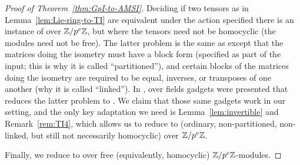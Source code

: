 \begin{proof}[Proof of Theorem~\ref{thm:GpI-to-AMSI}]
Deciding if two tensors as in Lemma~\ref{lem:Lie-ring-to-TI} are equivalent under the action specified there is an instance of  over $\mathbb{Z}/p^e \mathbb{Z}$, but where the tensors need not be homocyclic (the modules need not be free). The latter problem is the same as  except that the matrices doing the isometry must have a block form (specified as part of the input; this is why it is called ``partitioned''), and certain blocks of the matrices doing the isometry are required to be equal, inverses, or transposes of one another (why it is called ``linked''). In \cite{TI4}, over fields gadgets were presented that reduces the latter problem to . We claim that those same gadgets work in our setting, and the only key adaptation we need is Lemma~\ref{lem:invertible} and Remark~\ref{rem:TI4}, which allows us to reduce to (ordinary, non-partitioned, non-linked, but still not necessarily homocyclic)   over $\mathbb{Z}/p^e \mathbb{Z}$. 

Finally, we reduce to  over free (equivalently, homocyclic) $\mathbb{Z}/p^e \mathbb{Z}$-modules. 


\end{proof}
